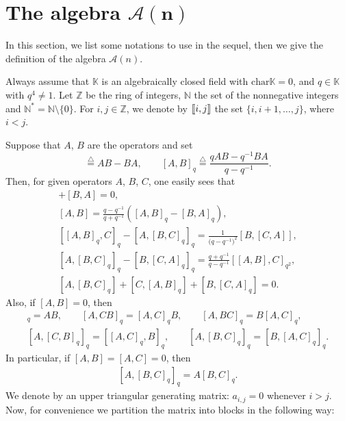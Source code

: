 \documentclass[pdftex]{sigma}
\numberwithin{equation}{section}
\def\lq#1{\left[#1\right]_q}
\def\K{\mathbb{K}}
\def\A{\mathscr{A}}
\def\lbb#1{\left[\kern-0.15em\left[ {#1} \right] \kern-0.15em\right]}
\begin{document}
\section[The algebra A(n)]{The algebra $\boldsymbol{\A(n)}$}\label{sect:notations}
In this section, we list some notations to use in the sequel, then we give the definition of the algebra $\A(n)$.

Always assume that $\K$ is an algebraically closed field with $\mathrm{char} \K=0$,
and $q \in \K$ with $q^4 \neq 1$. Let $\mathbb{Z}$ be the ring of integers, $\mathbb{N}$ the set of the nonnegative integers and $\mathbb{N}^*=\mathbb{N} \setminus\{0\}.$
For $i, j \in \mathbb{Z}$, we denote by $\lbb{i,j}$ the set $\{i, i+1, \dots, j\}$, where $i<j$.

Suppose that $A$, $B$ are the operators and set
\begin{equation*}
[A, B] \overset{\bigtriangleup}{=} AB-BA, \qquad \lq{A,B}\overset{\bigtriangleup}{=} \frac{qAB-q^{-1}BA}{q-q^{-1}}.
\end{equation*}
Then, for given operators $A$, $B$, $C$, one easily sees that
\begin{gather} %
[A,B]+[B,A]=0, \label{eq:jacobi}\\
 [A,B]=\frac{q-q^{-1}}{q+q^{-1}}([A,B]_q-[B,A]_q), \label{eq:qjacobi0}\\
[[A,B]_q,C]_q-[A,[B,C]_q]_q =\frac{1}{\bigl(q-q^{-1}\bigr)^2} [B,[C,A]], \label{eq:qjacobi1}\\
[A,[B,C]_q]_q-[B,[C,A]_q]_q =\frac{q+q^{-1}}{q-q^{-1}} [[A,B],C]_{q^2},\\
[A,[B,C]_q]+[C,[A,B]_q]+ [B,[C,A]_{q}]=0. \label{eq:qjacobi3}
\end{gather}
Also, if $[A,B]=0$, then
\begin{gather}
 [A,B]_q=AB, \qquad [A,CB]_q=[A,C]_qB, \qquad [A,BC]_q=B[A,C]_q, \label{equ:comm1}\\
 [A, [C,B]_q]_q=[[A,C]_q,B]_q, \qquad [A,[B,C]_q]_q=[B,[A,C]_q]_q. \label{equ:comm2}
\end{gather}
In particular, if $[A,B]=[A,C]=0$, then
\begin{eqnarray}\label{equ:comm3}
[A, [B,C]_q]_q=A[B,C]_q.
\end{eqnarray}
We denote by \smash{$\A \overset{\bigtriangleup}{=} (a_{i,j})_{n\times n}$} an upper triangular generating matrix: $a_{i,j}=0$ whenever $i>j$.
Now, for convenience we partition the matrix into blocks in the following way:
\end{document}
